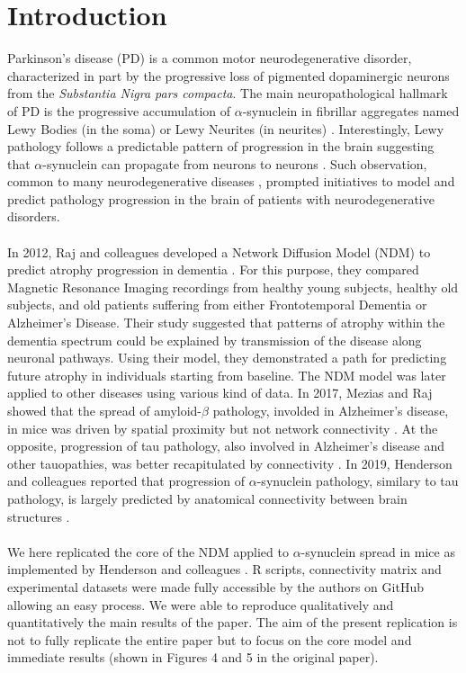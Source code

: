 \section{Introduction}

Parkinson's disease (PD) is a common motor neurodegenerative disorder, characterized in part by the progressive loss of pigmented dopaminergic neurons from the \textit{Substantia Nigra pars compacta}. The main neuropathological hallmark of PD is the progressive accumulation of $\alpha$-synuclein in fibrillar aggregates named Lewy Bodies (in the soma) or Lewy Neurites (in neurites) \cite{Dehay_2015}. Interestingly, Lewy pathology follows a predictable pattern of progression in the brain suggesting that $\alpha$-synuclein can propagate from neurons to neurons \cite{Braak_2003}. Such observation, common to many neurodegenerative diseases \cite{Jucker_2018}, prompted initiatives to model and predict pathology progression in the brain of patients with neurodegenerative disorders. \\
\\
In 2012, Raj and colleagues developed a Network Diffusion Model (NDM) to predict atrophy progression in dementia \cite{Raj_2012}. For this purpose, they compared Magnetic Resonance Imaging recordings from healthy young subjects, healthy old subjects, and old patients suffering from either Frontotemporal Dementia or Alzheimer's Disease. Their study suggested that patterns of atrophy within the dementia spectrum could be explained by transmission of the disease along neuronal pathways. Using their model, they demonstrated a path for predicting future atrophy in individuals starting from baseline. The NDM model was later applied to other diseases using various kind of data. In 2017, Mezias and Raj showed that the spread of amyloid-$\beta$ pathology, involded in Alzheimer's disease, in mice was driven by spatial proximity but not network connectivity \cite{Mezias_2017_abeta}. At the opposite, progression of tau pathology, also involved in Alzheimer's disease and other tauopathies, was better recapitulated by connectivity \cite{Mezias_2017_tau}. In 2019, Henderson and colleagues reported that progression of $\alpha$-synuclein pathology, similary to tau pathology, is largely predicted by anatomical connectivity between brain structures \cite{Henderson_2019}. \\
\\
We here replicated the  core of the NDM applied to $\alpha$-synuclein spread in mice as implemented by Henderson and colleagues \cite{Henderson_2019}. R scripts, connectivity matrix and experimental datasets were made fully accessible by the authors on GitHub allowing an easy process. We were able to reproduce qualitatively and quantitatively the main results of the paper. The aim of the present replication is not to fully replicate the entire paper but to focus on the core model and immediate results (shown in Figures 4 and 5 in the original paper).\\
\\

